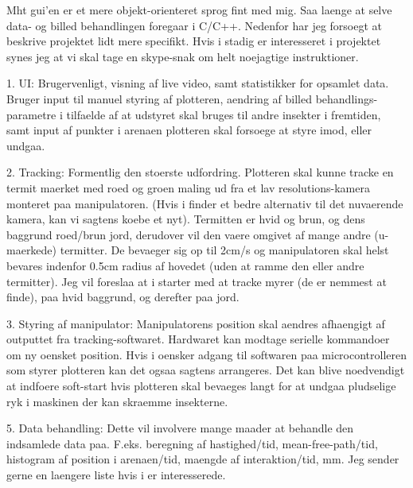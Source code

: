 Mht gui'en er et mere objekt-orienteret sprog fint med mig. Saa laenge at
selve data- og billed behandlingen foregaar i C/C++.
Nedenfor har jeg forsoegt at beskrive projektet lidt mere specifikt. Hvis
i stadig er interesseret i projektet synes jeg at vi skal tage en
skype-snak om helt noejagtige instruktioner.

1. UI:
Brugervenligt, visning af live video, samt statistikker for opsamlet data.
Bruger input til manuel styring af plotteren, aendring af billed
behandlings-parametre i tilfaelde af at udstyret skal bruges til andre
insekter i fremtiden, samt input af punkter i arenaen plotteren skal
forsoege at styre imod, eller undgaa.

2. Tracking:
Formentlig den stoerste udfordring. Plotteren skal kunne tracke en termit
maerket med roed og groen maling ud fra et lav resolutions-kamera monteret
paa manipulatoren. (Hvis i finder et bedre alternativ til det nuvaerende
kamera, kan vi sagtens koebe et nyt). Termitten er hvid og brun, og dens
baggrund roed/brun jord, derudover vil den vaere omgivet af mange andre
(u-maerkede) termitter. De bevaeger sig op til 2cm/s og manipulatoren skal
helst bevares indenfor 0.5cm radius af hovedet (uden at ramme den eller
andre termitter).
Jeg vil foreslaa at i starter med at tracke myrer (de er nemmest at
finde), paa hvid baggrund, og derefter paa jord.

3. Styring af manipulator:
Manipulatorens position skal aendres afhaengigt af outputtet fra
tracking-softwaret. Hardwaret kan modtage serielle kommandoer om ny
oensket position. Hvis i oensker adgang til softwaren paa
microcontrolleren som styrer plotteren kan det ogsaa sagtens arrangeres.
Det kan blive noedvendigt at indfoere soft-start hvis plotteren skal
bevaeges langt for at undgaa pludselige ryk i maskinen der kan skraemme
insekterne.

5. Data behandling: Dette vil involvere mange maader at behandle den
indsamlede data paa. F.eks. beregning af hastighed/tid,
mean-free-path/tid, histogram af position i arenaen/tid, maengde af
interaktion/tid, mm. Jeg sender gerne en laengere liste hvis i er
interesserede.

